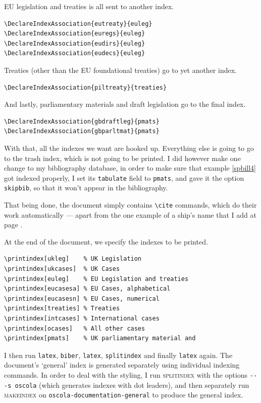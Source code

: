 \documentclass[a4paper,
               11pt,
	       DIV=1,			   
	       footinclude=false]
	      {scrartcl}
\begin{document}
EU legislation and treaties is all sent to another index.
\begin{verbatim}
\DeclareIndexAssociation{eutreaty}{euleg}
\DeclareIndexAssociation{euregs}{euleg}
\DeclareIndexAssociation{eudirs}{euleg}
\DeclareIndexAssociation{eudecs}{euleg}
\end{verbatim}

Treaties (other than the EU foundational treaties) go to yet another index.

\begin{verbatim}
\DeclareIndexAssociation{piltreaty}{treaties}
\end{verbatim}

And lastly, parliamentary materials and draft legislation go to the final index.
\begin{verbatim}
\DeclareIndexAssociation{gbdraftleg}{pmats}
\DeclareIndexAssociation{gbparltmat}{pmats}
\end{verbatim}

With that, all the indexes we want are hooked up. Everything else is going to go to the trash index, which is not going to be printed. I did however make one change to my bibliography database, in order to make sure that example \ref{spbill4} got indexed properly, I set its \texttt{tabulate} field to \texttt{pmats}, and gave it the option \texttt{skipbib}, so that it won't appear in the bibliography.

That being done, the document simply contains \verb|\cite| commands, which do their work automatically --- apart from the one example of a ship's name that I add at page \pageref{antaios85}.

At the end of the document, we specify the indexes to be printed.

\begin{verbatim}
\printindex[ukleg]    % UK Legislation
\printindex[ukcases]  % UK Cases
\printindex[euleg]    % EU Legislation and treaties
\printindex[eucasesa] % EU Cases, alphabetical
\printindex[eucasesn] % EU Cases, numerical
\printindex[treaties] % Treaties
\printindex[intcases] % International cases
\printindex[ocases]   % All other cases
\printindex[pmats]    % UK parliamentary material and
\end{verbatim}

I then run \texttt{latex}, \texttt{biber}, \texttt{latex}, \texttt{splitindex} and finally \texttt{latex} again. The document's `general' index is generated separately using individual indexing commands. In order to deal with the styling, I run \textsc{splitindex} with the options \verb|-- -s oscola| (which generates indexes with dot leaders), and then separately run \textsc{makeindex} on \texttt{oscola-documentation-general} to produce the general index.
\end{document}
